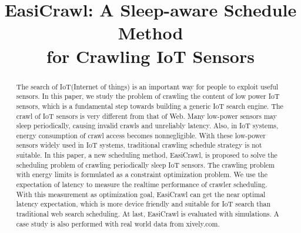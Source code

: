 \documentclass[conference]{IEEEtran}
\begin{document}
%
\title{EasiCrawl: A Sleep-aware Schedule Method \\for Crawling IoT Sensors}

\author{
}

\maketitle


\begin{abstract}
The search of IoT(Internet of things) is an important way for people to exploit useful sensors. In this paper, we study the problem of crawling the content of low power IoT sensors, which is a fundamental step towards building a generic IoT search engine.
The crawl of IoT sensors is very different from that of Web. Many low-power sensors may sleep periodically, causing invalid crawls and unreliably latency. Also, in IoT systems, energy consumption of crawl access becomes nonnegligible.
With these low-power sensors widely used in IoT systems, traditional crawling schedule strategy is not suitable.
In this paper, a new scheduling method, EasiCrawl, is proposed to solve the scheduling problem of crawling periodically sleep IoT sensors. The crawling problem with energy limits is formulated as a constraint optimization problem. We use the expectation of latency to measure the realtime performance of crawler scheduling. With this measurement as optimization goal, EasiCrawl can get the near optimal latency expectation, which is more device friendly and suitable for IoT search than traditional web search scheduling.
At last, EasiCrawl is evaluated with simulations. A case study is also performed with real world data from xively.com.
\end{abstract}
\end{document}
